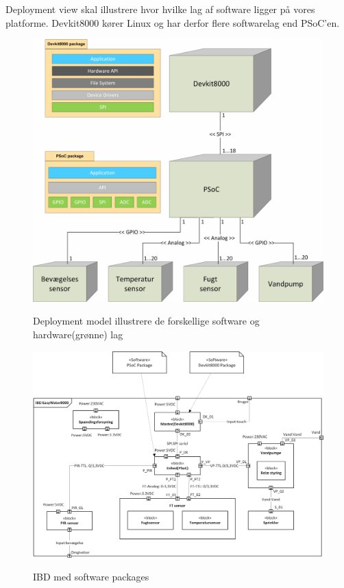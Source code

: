 
Deployment view skal illustrere hvor hvilke lag af software ligger på vores platforme. Devkit8000 kører Linux og har derfor flere softwarelag end PSoC'en.
 
\vspace{15 mm}

\begin{figure}[htbp] \centering
{\includegraphics[scale=0.7]{filer/systemarkitektur/Deployment_model}}
\caption{Deployment model illustrere de forskellige software og hardware(grønne) lag}
\label{fig:Deployment Model}
\end{figure}

\clearpage

\begin{figure}[!htbp] \centering
{\includegraphics[scale=0.7]{filer/systemarkitektur/IBD_deployment}}
\caption{IBD med software packages}
\label{fig:IBD deployment}
\end{figure}

